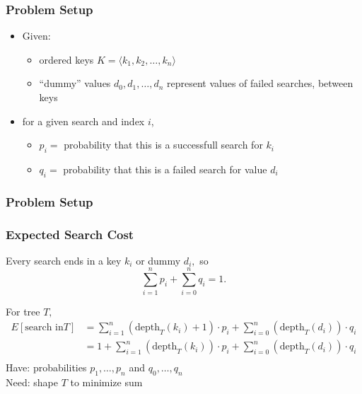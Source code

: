 \documentclass{beamer}
\begin{document}
\begin{frame} \frametitle{Problem Setup}
\begin{itemize}
  \item Given:
    \begin{itemize}
      \item ordered keys $K = \langle k_1, k_2, \ldots, k_n \rangle$
      \item ``dummy'' values $d_0, d_1, \ldots, d_n$ represent values of failed searches, between keys
    \end{itemize}
  \item for a given search and index $i$,
  \begin{itemize}
    \item $p_i = $ probability that this is a successfull search for $k_i$
    \item $q_i = $ probability that this is a failed search for value $d_i$
  \end{itemize}
\end{itemize}
\end{frame}

\begin{frame} \frametitle{Problem Setup}
\begin{center}
\end{center}
\end{frame}

\begin{frame} \frametitle{Expected Search Cost}
  Every search ends in a key $k_i$ or dummy $d_i,$ so
    \[ \sum_{i=1}^n p_i + \sum_{i=0}^n q_i = 1. \]

  For tree $T,$
  \begin{align*}
    E[\text{search in} T] & = \sum_{i=1}^n (\text{depth}_T(k_i)+1) \cdot p_i + \sum_{i=0}^n (\text{depth}_T(d_i)) \cdot q_i \\
      & = 1 + \sum_{i=1}^n (\text{depth}_T(k_i)) \cdot p_i + \sum_{i=0}^n (\text{depth}_T(d_i)) \cdot q_i \\
  \end{align*}
  Have: probabilities $p_1, \ldots, p_n$ and $q_0, \ldots, q_n$ \\
  Need: shape $T$ to minimize sum
\end{frame}
  
\end{document}
